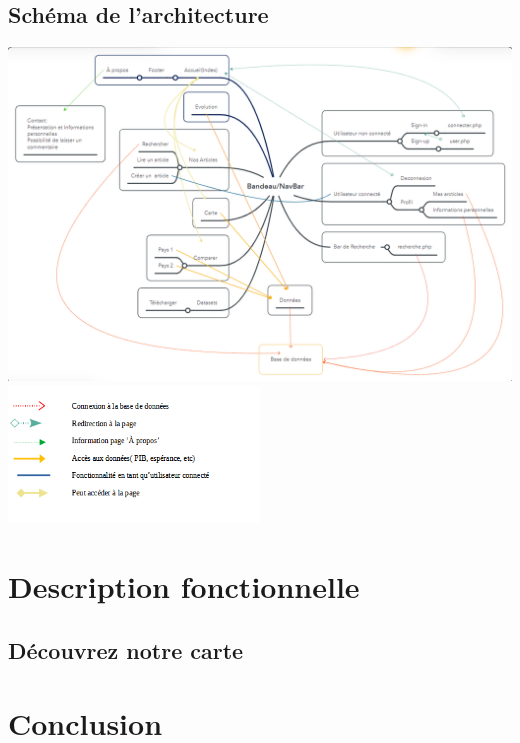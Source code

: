 \documentclass[12pt,a4paper]{report}
\begin{document}
\section{Schéma de l'architecture}
    \begin{center}
        \includegraphics[width=1\textwidth]{images/architecture.png}
        \includegraphics[width=0.5\textwidth]{images/legende_architecture.png}
    \end{center}

\chapter{Description fonctionnelle}
\section{Découvrez notre carte}

\chapter{Conclusion}
\end{document}
